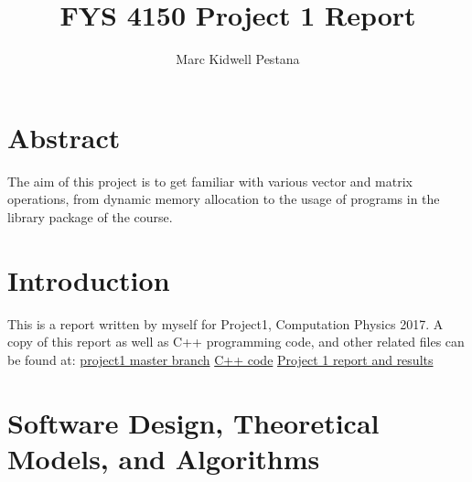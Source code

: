 \documentclass[11pt, oneside]{article}   	%
\title{FYS 4150 Project 1 Report}
\author{Marc Kidwell Pestana}
\date{}							%
\begin{document}
\maketitle
\section{Abstract}
The aim of this project is to get familiar with various vector and matrix operations, from dynamic memory allocation to the usage of programs in the library package of the course.
\section{Introduction}
This is a report written by myself for Project1, Computation Physics 2017. A copy of this report as well as C++ programming code, and other related files can be found at:\newline\newline
\href{https://github.com/marckp/project1}{project1 master branch}\newline
\href{https://github.com/marckp/project1/tree/master/project1}{C++ code}\newline
\href{https://github.com/marckp/project1/tree/master/project1/Documentation}{Project 1 report and results}
\section{Software Design, Theoretical Models, and Algorithms}
\end{document}
